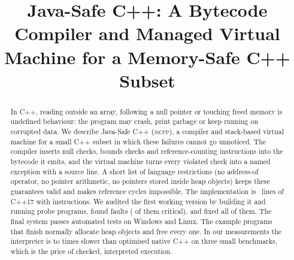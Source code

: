 \documentclass[conference]{IEEEtran}
\newcommand{\jscpp}{\textsc{jscpp}}
\begin{document}
\title{Java-Safe C++: A Bytecode Compiler and Managed Virtual Machine for a Memory-Safe C++ Subset}

\author{%
\and
{}
\and
{}
}

\maketitle

\begin{abstract}
In C++, reading outside an array, following a null pointer or touching freed memory is undefined behaviour:
the program may crash, print garbage or keep running on corrupted data. We describe Java-Safe C++ (\jscpp),
a compiler and stack-based virtual machine for a small C++ subset in which these failures cannot go unnoticed.
The compiler inserts null checks, bounds checks and reference-counting instructions into the bytecode it emits,
and the virtual machine turns every violated check into a named exception with a source line. A short list of
language restrictions (no address-of operator, no pointer arithmetic, no pointers stored inside heap objects)
keeps these guarantees valid and makes reference cycles impossible. The implementation is
~lines of C++17 with  instructions. We audited the first working version by building
it and running probe programs, found  faults ( of them critical), and fixed
all of them. The final system passes  automated tests on Windows and Linux. The
 example programs that finish normally allocate  heap
objects and free every one. In our measurements the interpreter is  to  times
slower than optimised native C++ on three small benchmarks, which is the price of checked, interpreted execution.
\end{abstract}
\end{document}
